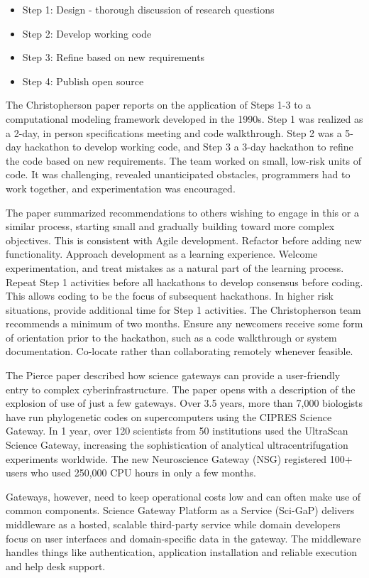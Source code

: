 \documentclass[11pt, oneside]{amsart}
\begin{document}
\begin{itemize}
\item Step 1: Design - thorough discussion of research questions
\item Step 2: Develop working code
\item Step 3: Refine based on new requirements
\item Step 4: Publish open source
\end{itemize}

The Christopherson paper reports on the application of Steps 1-3 to a
computational modeling framework developed in the 1990s. Step 1 was realized as
a 2-day, in person specifications meeting and code walkthrough. Step 2 was a
5-day hackathon to develop working code, and Step 3 a 3-day hackathon to refine
the code based on new requirements. The team worked on small, low-risk units of
code. It was challenging, revealed unanticipated obstacles, programmers had to
work together, and experimentation was encouraged.

The paper summarized recommendations to others wishing to engage in this or a
similar process, starting small and gradually building toward more complex
objectives. This is consistent with Agile development. Refactor before adding
new functionality. Approach development as a learning experience. Welcome
experimentation, and treat mistakes as a natural part of the learning process.
Repeat Step 1 activities before all hackathons to develop consensus before
coding. This allows coding to be the focus of subsequent hackathons. In higher
risk situations, provide additional time for Step 1 activities. The
Christopherson team recommends a minimum of two months. Ensure any newcomers
receive some form of orientation prior to the hackathon, such as a code
walkthrough or system documentation. Co-locate rather than collaborating
remotely whenever feasible.

The Pierce paper described how science gateways can provide a user-friendly
entry to complex cyberinfrastructure. The paper opens with a description of the
explosion of use of just a few gateways. Over 3.5 years, more than 7,000
biologists have run phylogenetic codes on supercomputers using the CIPRES
Science Gateway. In 1 year, over 120 scientists from 50 institutions used the
UltraScan Science Gateway, increasing the sophistication of analytical
ultracentrifugation experiments worldwide. The new Neuroscience Gateway (NSG)
registered 100+ users who used 250,000 CPU hours in only a few months.

Gateways, however, need to keep operational costs low and can often make use of
common components. Science Gateway Platform as a Service (Sci-GaP) delivers
middleware as a hosted, scalable third-party service while domain developers
focus on user interfaces and domain-specific data in the gateway. The
middleware handles things like authentication, application installation and
reliable execution and help desk support.
\end{document}
